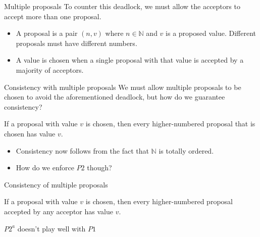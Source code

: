 \documentclass{beamer}
\begin{document}
\begin{frame}{Multiple proposals}
  To counter this deadlock, we must allow the acceptors to accept more than one proposal.
  \begin{itemize}
    \item A proposal is a pair $(n, v)$ where $n \in \mathbb{N}$ and $v$ is a proposed value. Different proposals must have different numbers.
    \item A value is chosen when a \alert{single proposal with that value} is accepted by a majority of acceptors.
  \end{itemize}
\end{frame}

\begin{frame}{Consistency with multiple proposals}
  We must allow multiple proposals to be chosen to avoid the aforementioned deadlock, but how do we guarantee consistency?
  \begin{invariant}[P2]
    If a proposal with value $v$ is chosen, then every higher-numbered proposal that is chosen has value $v$.
  \end{invariant}
  \begin{itemize}
    \item Consistency now follows from the fact that $\mathbb{N}$ is totally ordered.
    \item How do we enforce $P2$ though?
  \end{itemize}
\end{frame}

\begin{frame}{Consistency of multiple proposals}
  \begin{invariant}[$P2^a$]
    If a proposal with value $v$ is chosen, then every higher-numbered proposal accepted by \alert{any} acceptor has value $v$.
  \end{invariant}
\end{frame}

\begin{frame}{$P2^a$ doesn't play well with $P1$}
  \begin{figure}[!h]
  \centering
  \end{figure}
\end{frame}
\end{document}
